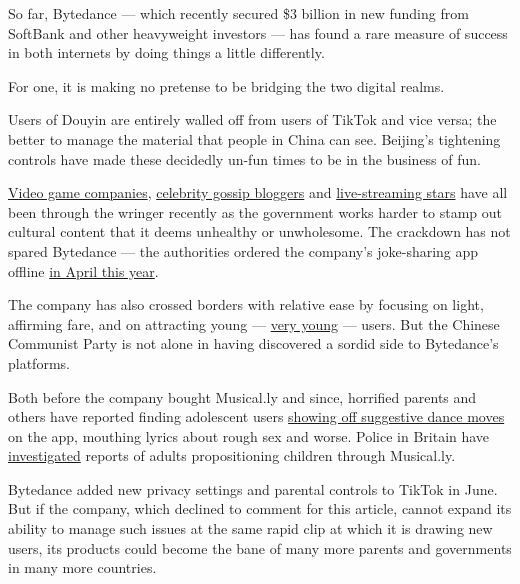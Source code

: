 So far, Bytedance --- which recently secured \$3 billion in new funding
from SoftBank and other heavyweight investors --- has found a rare
measure of success in both internets by doing things a little
differently.

For one, it is making no pretense to be bridging the two digital realms.

Users of Douyin are entirely walled off from users of TikTok and vice
versa; the better to manage the material that people in China can see.
Beijing's tightening controls have made these decidedly un-fun times to
be in the business of fun.

\href{https://www.nytimes.com/2018/08/31/technology/china-videogames-myopia-tencent.html}{Video
game companies},
\href{https://www.nytimes.com/2017/06/09/world/asia/china-celebrity-news-wechat.html}{celebrity
gossip bloggers} and
\href{https://www.nytimes.com/2018/10/16/world/asia/china-yang-kaili-anthem.html}{live-streaming
stars} have all been through the wringer recently as the government
works harder to stamp out cultural content that it deems unhealthy or
unwholesome. The crackdown has not spared Bytedance --- the authorities
ordered the company's joke-sharing app offline
\href{https://www.nytimes.com/2018/04/11/technology/china-toutiao-bytedance-censor.html}{in
April this year}.

The company has also crossed borders with relative ease by focusing on
light, affirming fare, and on attracting young ---
\href{https://www.nytimes.com/2016/09/17/business/media/a-social-network-frequented-by-children-tests-the-limits-of-online-regulation.html}{very
young} --- users. But the Chinese Communist Party is not alone in having
discovered a sordid side to Bytedance's platforms.

Both before the company bought Musical.ly and since, horrified parents
and others have reported finding adolescent users
\href{https://medium.com/s/parenting-stories/porn-is-not-the-worst-thing-on-musical-ly-5df07ab842af}{showing
off suggestive dance moves} on the app, mouthing lyrics about rough sex
and worse. Police in Britain have
\href{http://www.edp24.co.uk/news/crime/police-investigation-after-two-children-from-eastgate-academy-in-king-s-lynn-allegedly-groomed-on-musical-ly-app-1-5036808}{investigated}
reports of adults propositioning children through Musical.ly.

Bytedance added new privacy settings and parental controls to TikTok in
June. But if the company, which declined to comment for this article,
cannot expand its ability to manage such issues at the same rapid clip
at which it is drawing new users, its products could become the bane of
many more parents and governments in many more countries.

